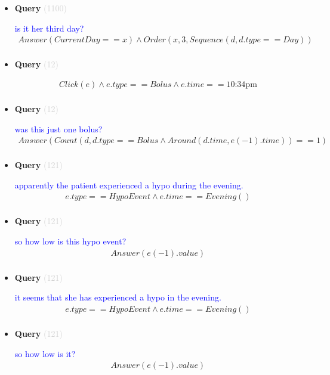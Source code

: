 \documentclass[11pt]{article}
\newcommand{\key}[1]{\textcolor{lightgray}{#1}}
\newcounter{CQuery}
\begin{document}
\begin{itemize}
\item
\textbf{Query\theCQuery} \key{(1100)} \addtocounter{CQuery}{1}
\textcolor{blue}{ is it her third day? }
\begin{multline*}
Answer(CurrentDay==x) \wedge Order(x, 3, Sequence(d, d.type==Day)) \\ 
\end{multline*}


\item
\textbf{Query\theCQuery} \key{(12)} \addtocounter{CQuery}{1}
\textcolor{blue}{  }
\begin{multline*}
Click(e) \wedge e.type == Bolus \wedge e.time==\mbox{10:34pm} \\ 
\end{multline*}


\item
\textbf{Query\theCQuery} \key{(12)} \addtocounter{CQuery}{1}
\textcolor{blue}{ was this just one bolus? }
\begin{multline*}
Answer(Count(d, d.type==Bolus \wedge Around(d.time, e(-1).time))==1) \\ 
\end{multline*}


\item
\textbf{Query\theCQuery} \key{(121)} \addtocounter{CQuery}{1}
\textcolor{blue}{ apparently the patient experienced a hypo during the evening. }
\begin{multline*}
e.type==HypoEvent \wedge e.time==Evening() \\ 
\end{multline*}


\item
\textbf{Query\theCQuery} \key{(121)} \addtocounter{CQuery}{1}
\textcolor{blue}{ so how low is this hypo event? }
\begin{multline*}
Answer(e(-1).value) \\ 
\end{multline*}


\item
\textbf{Query\theCQuery} \key{(121)} \addtocounter{CQuery}{1}
\textcolor{blue}{ it seems that she has experienced a hypo in the evening. }
\begin{multline*}
e.type==HypoEvent \wedge e.time==Evening() \\ 
\end{multline*}


\item
\textbf{Query\theCQuery} \key{(121)} \addtocounter{CQuery}{1}
\textcolor{blue}{ so how low is it? }
\begin{multline*}
Answer(e(-1).value) \\ 
\end{multline*}



\end{itemize}
\end{document}
